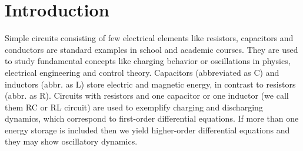 \documentclass[a4paper, 10pt, twoside, twocolumn]{scrartcl}
\begin{document}
\maketitle
\noindent
\parbox{\columnwidth}{
		\setlength{\fboxrule}{0.8pt}
		\setlength{\fboxsep}{1.7mm}
		{\color{SNE_GRAY}
}
		\vspace{-1.55 mm}
	}
	\normalsize
	\fontsize{10.3pt}{1.15em}\selectfont
	
\section*{Introduction}


Simple circuits consisting of few electrical elements like resistors, capacitors and conductors are standard examples in school and academic courses. They are used to study fundamental concepts like charging behavior or oscillations in physics, electrical engineering and control theory. Capacitors (abbreviated as C) and inductors (abbr. as L) store electric and magnetic energy, in contrast to resistors (abbr. as R). Circuits with resistors and one capacitor or one inductor (we call them RC or RL circuit) are used to exemplify charging and discharging dynamics, which correspond to first-order differential equations. If more than one energy storage is included then we yield higher-order differential equations and they may show oscillatory dynamics. 
\end{document}
